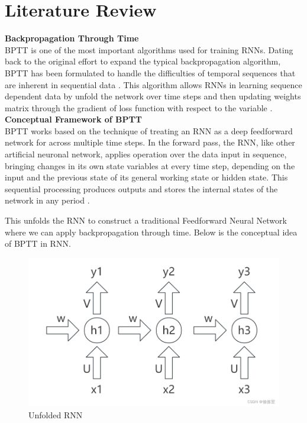 \documentclass[12pt,a4paper]{article}
\begin{document}
\section{Literature Review}
\textbf{Backpropagation Through Time}
\\[1ex]
BPTT is one of the most important algorithms used for training RNNs. Dating back to the original effort to expand the typical backpropagation algorithm, BPTT has been formulated to handle the difficulties of temporal sequences that are inherent in sequential data \parencite{werbos1990bptt}. This algorithm allows RNNs in learning sequence dependent data by unfold the network over time steps and then updating weights matrix through the gradient of loss function with respect to the variable \parencite{rumelhart1986backpropagation}.
\\[2ex]
\textbf{Conceptual Framework of BPTT}
\\[1ex]
BPTT works based on the technique of treating an RNN as a deep feedforward network for across multiple time steps. In the forward pass, the RNN, like other artificial neuronal network, applies operation over the data input in sequence, bringing changes in its own state variables at every time step, depending on the input and the previous state of its general working state or hidden state. This sequential processing produces outputs and stores the internal states of the network in any period \parencite{werbos1990bptt}.

This unfolds the RNN to construct a traditional Feedforward Neural Network where we can apply backpropagation through time. Below is the conceptual idea of BPTT in RNN.
\begin{figure}[h!]
    \centering
    \includegraphics[width=1\textwidth]{../Pic/pic1.png} %
    \caption{Unfolded RNN}
\end{figure}
\end{document}
